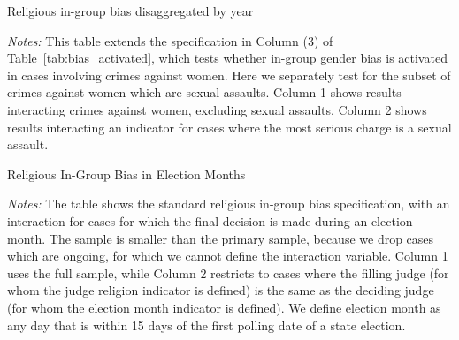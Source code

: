 \documentclass[12pt,english]{article}
\newcommand{\HOME}{\string~}
\newcommand{\curpath}{\HOME/ddl/justice-overleaf}
\newcommand{\curpath}{.}
\begin{document}
\begin{appendices}
  \newpage
  \begin{table}[h!]%
    \begin{center}
        \caption{Religious in-group bias disaggregated by year}
      \label{tab:religion_by_year}
            
  \begin{minipage}{1.1\textwidth}
    \footnotesize \emph{Notes:}
    This table extends the specification in Column (3) of Table~\ref{tab:bias_activated}, which tests whether in-group gender bias is activated in cases involving crimes against women. Here we separately test for the subset of crimes against women which are sexual assaults. Column 1 shows results interacting crimes against women, excluding sexual assaults. Column 2 shows results interacting an indicator for cases where the most serious charge is a sexual assault. \\ 
   \end{minipage}
      \end{center}
    \end{table}

  \newpage
  
\begin{table}[h!]
  \begin{center}
  \caption{Religious In-Group Bias in Election Months}
      \label{tab:election_month}
  
  \end{center}
   \begin{minipage}{1.0\textwidth}
     {\scriptsize \emph{Notes:} The table shows the standard religious in-group bias specification, with an interaction for cases for which the final decision is made during an election month. The sample is smaller than the primary sample, because we drop cases which are ongoing, for which we cannot define the interaction variable. Column 1 uses the full sample, while Column 2 restricts to cases where the filling judge (for whom the judge religion indicator is defined) is the same as the deciding judge (for whom the election month indicator is defined). We define election month as any day that is within 15 days of the first polling date of a state election.
\par}
 \end{minipage}
\end{table}

  \newpage
  

\end{appendices}
\end{document}

